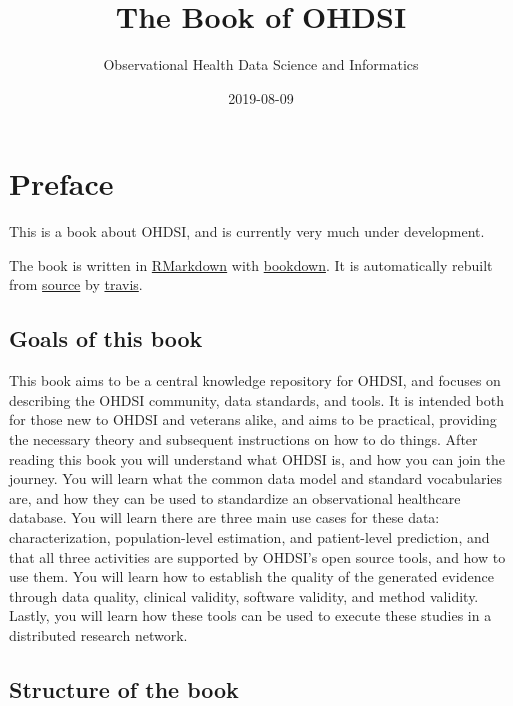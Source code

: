 \documentclass[11pt]{book}
\title{The Book of OHDSI}
\author{Observational Health Data Science and Informatics}
\date{2019-08-09}
\theoremstyle{definition}
\theoremstyle{definition}
\theoremstyle{definition}
\theoremstyle{remark}
\begin{document}
\maketitle

{
\setcounter{tocdepth}{1}
\tableofcontents
}
\hypertarget{preface}{%
\chapter*{Preface}\label{preface}}

This is a book about OHDSI, and is currently very much under development.

The book is written in \href{https://rmarkdown.rstudio.com}{RMarkdown} with \href{https://bookdown.org}{bookdown}. It is automatically rebuilt from \href{https://github.com/OHDSI/TheBookOfOhdsi}{source} by \href{http://travis-ci.org/}{travis}.

\hypertarget{goals-of-this-book}{%
\section*{Goals of this book}\label{goals-of-this-book}}

This book aims to be a central knowledge repository for OHDSI, and focuses on describing the OHDSI community, data standards, and tools. It is intended both for those new to OHDSI and veterans alike, and aims to be practical, providing the necessary theory and subsequent instructions on how to do things. After reading this book you will understand what OHDSI is, and how you can join the journey. You will learn what the common data model and standard vocabularies are, and how they can be used to standardize an observational healthcare database. You will learn there are three main use cases for these data: characterization, population-level estimation, and patient-level prediction, and that all three activities are supported by OHDSI's open source tools, and how to use them. You will learn how to establish the quality of the generated evidence through data quality, clinical validity, software validity, and method validity. Lastly, you will learn how these tools can be used to execute these studies in a distributed research network.

\hypertarget{structure-of-the-book}{%
\section*{Structure of the book}\label{structure-of-the-book}}
\end{document}
